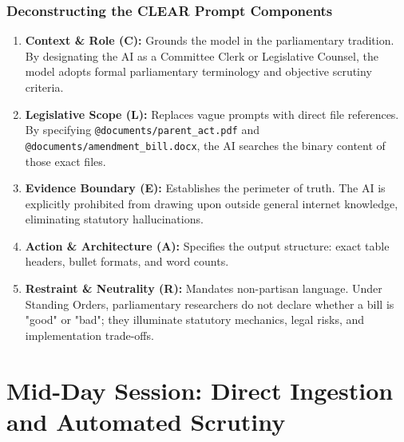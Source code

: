 \documentclass[11pt, a4paper]{report}
\begin{document}
\subsection{Deconstructing the CLEAR Prompt Components}
\begin{enumerate}[label=\textbf{\arabic*.}]
    \item \textbf{Context \& Role (C):} Grounds the model in the parliamentary tradition. By designating the AI as a Committee Clerk or Legislative Counsel, the model adopts formal parliamentary terminology and objective scrutiny criteria.
    \item \textbf{Legislative Scope (L):} Replaces vague prompts with direct file references. By specifying \texttt{@documents/parent\_act.pdf} and \texttt{@documents/amendment\_bill.docx}, the AI searches the binary content of those exact files.
    \item \textbf{Evidence Boundary (E):} Establishes the perimeter of truth. The AI is explicitly prohibited from drawing upon outside general internet knowledge, eliminating statutory hallucinations.
    \item \textbf{Action \& Architecture (A):} Specifies the output structure: exact table headers, bullet formats, and word counts.
    \item \textbf{Restraint \& Neutrality (R):} Mandates non-partisan language. Under Standing Orders, parliamentary researchers do not declare whether a bill is "good" or "bad"; they illuminate statutory mechanics, legal risks, and implementation trade-offs.
\end{enumerate}

\vspace{1.5em}
\noindent{}
\vspace{1.5em}

\newpage

\chapter{Mid-Day Session: Direct Ingestion and Automated Scrutiny}
\end{document}
